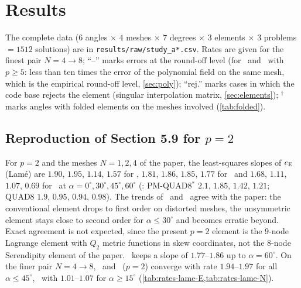 \section{Results}\label{sec:results}
The complete data ($6$ angles $\times$ $4$ meshes $\times$ $7$ degrees $\times$ $3$ elements
$\times$ $3$ problems $=1512$ solutions) are in \texttt{results/raw/study\_a*.csv}.
Rates are given for the finest pair $N=4\to8$; ``--'' marks errors at the round-off
level (for \PM\ and \PH\ with $p\ge5$: less than ten times the error of the polynomial field on
the same mesh, which is the empirical round-off level, \cref{sec:poly}); ``rej.'' marks
cases in which the code base rejects the element (singular interpolation matrix,
\cref{sec:elements}); $^\dagger$ marks angles with folded elements on the meshes involved
(\cref{tab:folded}).

\subsection{Reproduction of Section 5.9 for $p=2$}\label{sec:p2}
For $p=2$ and the meshes $N=1,2,4$ of the paper, the least-squares slopes of $e_{\mathrm{E}}$
(Lam\'e) are $1.90$, $1.95$, $1.14$, $1.57$ for \PM, $1.81$, $1.86$, $1.85$, $1.77$ for \PH\
and $1.68$, $1.11$, $1.07$, $0.69$ for \PP\ at $\alpha=0^\circ,30^\circ,45^\circ,60^\circ$
(\citet[Fig.~20]{Rajendran2010technique}: PM-QUAD8$^\ast$ $2.1$, $1.85$, $1.42$, $1.21$;
QUAD8 $1.9$, $0.95$, $0.94$, $0.98$). The trends of \PM\ and \PP\ agree with the paper: the
conventional element drops to first order on distorted meshes, the unsymmetric element stays
close to second order for $\alpha\le30^\circ$ and becomes erratic beyond. Exact agreement is not
expected, since the present $p=2$ element is the 9-node Lagrange element with $Q_2$ metric
functions in skew coordinates, not the 8-node Serendipity element of the paper. \PH\ keeps a
slope of $1.77$--$1.86$ up to $\alpha=60^\circ$. On the finer pair $N=4\to8$, \PM\ and \PH\
($p=2$) converge with rate $1.94$--$1.97$ for all $\alpha\le45^\circ$, \PP\ with $1.01$--$1.07$
for $\alpha\ge15^\circ$ (\cref{tab:rates-lame-E,tab:rates-lame-N}).

